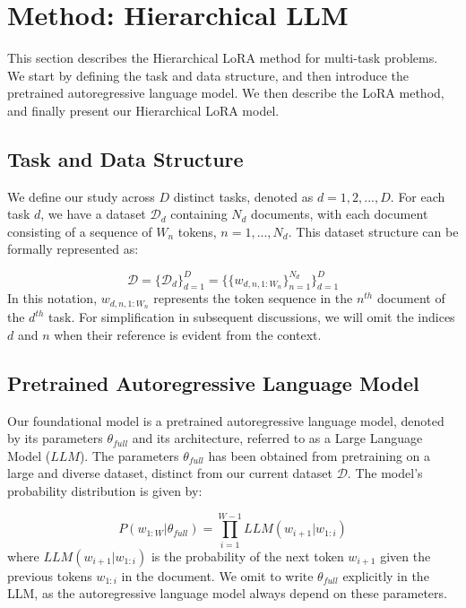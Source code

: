 \documentclass[fullpaper]{nldl}
\begin{document}
\section{Method: Hierarchical LLM} \label{sec:method}
This section describes the Hierarchical LoRA method for multi-task problems. We start by defining the task and data structure, and then introduce the pretrained autoregressive language model. We then describe the LoRA method, and finally present our Hierarchical LoRA model.

\subsection{Task and Data Structure}
We define our study across $D$ distinct tasks, denoted as $d=1,2,...,D$. For each task $d$, we have a dataset $\mathcal{D}_d$ containing $N_d$ documents, with each document consisting of a sequence of $W_n$ tokens, $n=1,..., N_d$. This dataset structure can be formally represented as:

\begin{equation} \label{eq:data}
\mathcal{D} = \{ \mathcal{D}_d \}_{d=1}^D  =  \{ \{ w_{d,n,1:W_n} \}_{n=1}^{N_d} \}_{d=1}^D
\end{equation}
%
In this notation, $w_{d,n,1:W_n}$ represents the token sequence in the $n^{th}$ document of the $d^{th}$ task. For simplification in subsequent discussions, we will omit the indices $d$ and $n$ when their reference is evident from the context.

\subsection{Pretrained Autoregressive Language Model}
Our foundational model is a pretrained autoregressive language model, denoted by its parameters $\theta_{full}$ and its architecture, referred to as a Large Language Model ($LLM$). The parameters $\theta_{full}$ has been obtained from pretraining on a large and diverse dataset, distinct from our current dataset $\mathcal{D}$. 
The model's probability distribution is given by:

\begin{equation} \label{eq:LLMprob}
P(w_{1:W} | \theta_{full}) = \prod_{i=1}^{W-1} LLM(w_{i+1} | w_{1:i})
\end{equation}
%
where $LLM(w_{i+1} | w_{1:i})$ is the probability of the next token $w_{i+1}$ given the previous tokens $w_{1:i}$ in the document.
We omit to write $\theta_{full}$ explicitly in the LLM, as the autoregressive language model always depend on these parameters.
\end{document}
